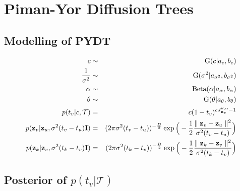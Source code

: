 \documentclass{article}
\begin{document}
\section{Piman-Yor Diffusion Trees}
\subsection{Modelling of PYDT}	

	\begin{eqnarray}
		c &\sim& \textrm{G}(c | a_c, b_c) \\
		\frac{1}{\sigma^2} &\sim& \textrm{G}(\sigma^2 | a_{\sigma^2}, b_{\sigma^2}) \\
		\alpha &\sim& \textrm{Beta}(\alpha | a_\alpha, b_\alpha) \\ 
		\theta &\sim& \textrm{G}(\theta | a_\theta, b_\theta) \\
		p(t_v | c, \mathcal{T}) &=& c(1-t_v)^{cJ^{\theta,\alpha}_{\bold{n}_v} - 1} \\
		p(\bold{z}_v | \bold{z}_u, \sigma^2(t_v - t_u)\bold{I}) &=& (2 \pi \sigma^2(t_v - t_u))^{-\frac{D}{2}} \exp \Big(-\frac{1}{2}\frac{\parallel \bold{z}_v - \bold{z}_u \parallel^2}{\sigma^2 (t_v - t_u)} \Big)\\
		p(\bold{z}_k | \bold{z}_v, \sigma^2(t_k - t_v)\bold{I}) &=& (2 \pi \sigma^2(t_k - t_v))^{-\frac{D}{2}} \exp \Big(-\frac{1}{2}\frac{\parallel \bold{z}_k - \bold{z}_v \parallel^2}{\sigma^2 (t_k - t_v)} \Big)\\
	\end{eqnarray}


\subsection{Posterior of $p(t_v | \mathcal{T})$}	
	
\end{document}
